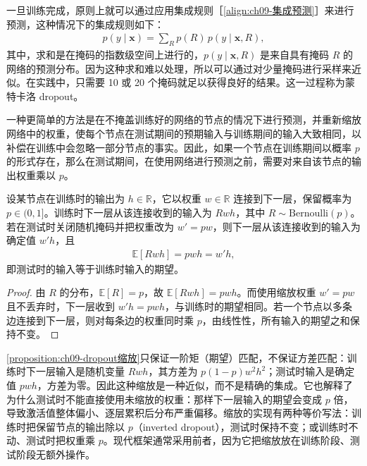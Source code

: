 \documentclass[../../main.tex]{subfiles}
\begin{document}
一旦训练完成，原则上就可以通过应用集成规则［\eqref{align:ch09-集成预测}］来进行预测，这种情况下的集成规则如下：
\begin{align}
p(y\mid\boldsymbol{x})=\sum_{R}p(R)\,p(y\mid\boldsymbol{x},R),
\label{align:ch09-dropout集成}
\end{align}
其中，求和是在掩码的指数级空间上进行的，$p(y\mid\boldsymbol{x},R)$ 是来自具有掩码 $R$ 的网络的预测分布。因为这种求和难以处理，所以可以通过对少量掩码进行采样来近似。在实践中，只需要 10 或 20 个掩码就足以获得良好的结果。这一过程称为蒙特卡洛 dropout。

一种更简单的方法是在不掩盖训练好的网络的节点的情况下进行预测，并重新缩放网络中的权重，使每个节点在测试期间的预期输入与训练期间的输入大致相同，以补偿在训练中会忽略一部分节点的事实。因此，如果一个节点在训练期间以概率 $p$ 的形式存在，那么在测试期间，在使用网络进行预测之前，需要对来自该节点的输出权重乘以 $p$。

\begin{proposition}\label{proposition:ch09-dropout缩放}
设某节点在训练时的输出为 $h\in\mathbb{R}$，它以权重 $w\in\mathbb{R}$ 连接到下一层，保留概率为 $p\in(0,1]$。训练时下一层从该连接收到的输入为 $Rwh$，其中 $R\sim\mathrm{Bernoulli}(p)$。若在测试时关闭随机掩码并把权重改为 $w'=pw$，则下一层从该连接收到的输入为确定值 $w'h$，且
\begin{align*}
\mathbb{E}[Rwh]=pwh=w'h,
\end{align*}
即测试时的输入等于训练时输入的期望。
\end{proposition}

\begin{proof}
由 $R$ 的分布，$\mathbb{E}[R]=p$，故 $\mathbb{E}[Rwh]=pwh$。而使用缩放权重 $w'=pw$ 且不丢弃时，下一层收到 $w'h=pwh$，与训练时的期望相同。若一个节点以多条边连接到下一层，则对每条边的权重同时乘 $p$，由线性性，所有输入的期望之和保持不变。
\end{proof}

\begin{remark}\cref{proposition:ch09-dropout缩放}只保证一阶矩（期望）匹配，不保证方差匹配：训练时下一层输入是随机变量 $Rwh$，其方差为 $p(1-p)w^{2}h^{2}$；测试时输入是确定值 $pwh$，方差为零。因此这种缩放是一种近似，而不是精确的集成。它也解释了为什么测试时不能直接使用未缩放的权重：那样下一层输入的期望会变成 $p$ 倍，导致激活值整体偏小、逐层累积后分布严重偏移。缩放的实现有两种等价写法：训练时把保留节点的输出除以 $p$（inverted dropout），测试时保持不变；或训练时不动、测试时把权重乘 $p$。现代框架通常采用前者，因为它把缩放放在训练阶段、测试阶段无额外操作。
\end{remark}
\end{document}
